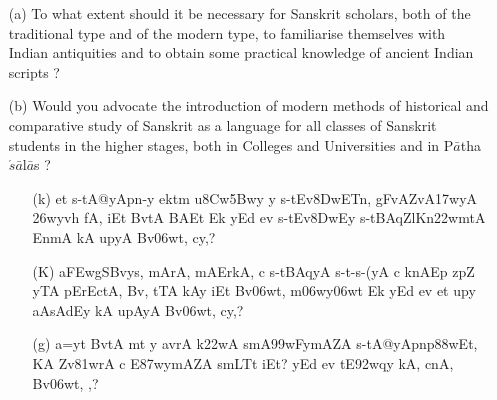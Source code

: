 {\begin{itemize}
\begin{itemize}
           \item[(a)] To what extent should it be necessary for Sanskrit scholars, both of the traditional type and of the modern type, to familiarise themselves with Indian antiquities and to obtain some practical knowledge of ancient Indian scripts ?
           
           \item[(b)] Would you advocate the introduction of modern methods of historical and comparative study of Sanskrit as a language for all classes of Sanskrit students in the higher stages, both in Colleges and Universities and in P$\bar{a}$tha$\acute{s}\bar{a}$l$\bar{a}$s ?
           
           \end{itemize}
\end{itemize}
}

\begin{itemize}  
 \item[{\dn \dnnum \rn{22}}] \begin{itemize}
               
               \item[({\dn k})] {\dn et s\2-tA@yApn-y ektm u\38Cw\?\35Bwy y s\2-tEv\38DwET\0n, gFvA\0ZvA\317wyA\2 \326wyvh fA, iEt BvtA\2 BAEt Ek yEd ev s\2-tEv\38DwEy\0 s\2-tBAqZl\?Kn\322wmtA\2 EnmA\0\2 kA upyA Bv\306wt, cy\?,{\rs ?\re}}
               
               \item[({\dn K})] {\dn a\3FEwgSBvys, mArA, mAErkA, c s\2-tBAqyA s\2-t{\rs -\re}s\2-(yA c k\?nAEp zp\?Z yTA pErEctA, Bv\?, tTA kAy\0 iEt Bv\306wt, m\306wy\306wt\? Ek yEd ev et up\?y aAsAdEy\2 kA upAyA Bv\306wt, cy\?,{\rs ?\re}}
               
               \item[({\dn g})] {\dn a=y\?t BvtA\2 mt y avrA k\322wA smA\399wFymAZA s\2-tA@yApnp\388wEt, KA Zv\381wrA c E\387wymAZA smLT\?{\qvb}t iEt{\rs ?\re} yEd ev tE\392wqy\? kA, cnA, Bv\306wt, \0,{\rs ?\re}}
 
                \end{itemize}      
                                                                
\end{itemize}

